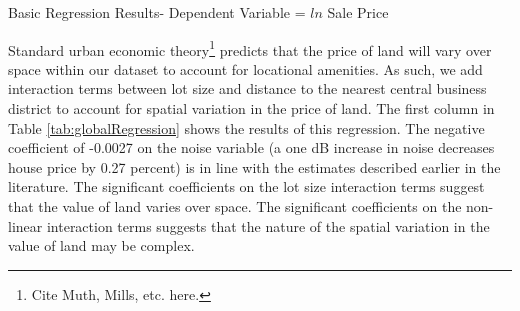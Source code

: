 \documentclass{article}\usepackage{graphicx, color}
\begin{document}
\begin{table}
\caption{Basic Regression Results- Dependent Variable = $ln$ Sale Price}\label{tab:globalRegression}

\end{table}


Standard urban economic theory\footnote{Cite Muth, Mills, etc. here.} predicts that the price of land will vary over space within our dataset to account for locational amenities. As such, we add interaction terms between lot size and distance to the nearest central business district to account for spatial variation in the price of land. The first column in Table \ref{tab:globalRegression} shows the results of this regression. The negative coefficient of -0.0027 on the noise variable (a one dB increase in noise decreases house price by 0.27 percent) is in line with the estimates described earlier in the literature. The significant coefficients on the lot size interaction terms suggest that the value of land varies over space. The significant coefficients on the non-linear interaction terms suggests that the nature of the spatial variation in the value of land may be complex.
\end{document}
